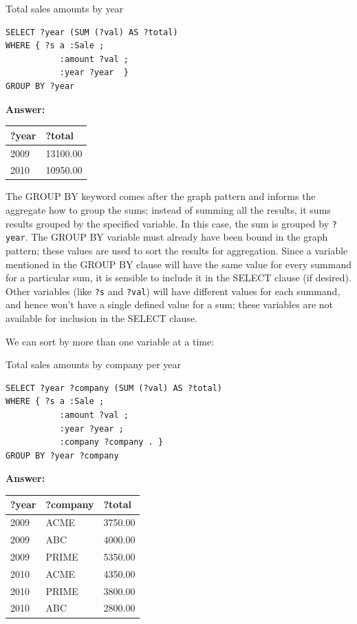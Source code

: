 \begin{query}Total sales amounts by year\end{query}

\begin{lstlisting}
SELECT ?year (SUM (?val) AS ?total)
WHERE { ?s a :Sale ;
           :amount ?val ;
           :year ?year  }
GROUP BY ?year
\end{lstlisting}

\textbf{\textbf{Answer:}}

\begin{tabular}{|ll|}
\hline
?year&?total\\
\hline
2009&13100.00\\
2010&10950.00\\
\hline
\end{tabular}

The GROUP BY keyword comes after the graph pattern and informs the
aggregate how to group the sums; instead of summing all the results, it
sums results grouped by the specified variable. In this case, the sum is
grouped by \texttt{?year}. The GROUP BY variable must already have been bound in
the graph pattern; these values are used to sort the results for
aggregation. Since a variable mentioned in the GROUP BY clause will have
the same value for every summand for a particular sum, it is sensible to
include it in the SELECT clause (if desired). Other variables (like \texttt{?s}
and \texttt{?val}) will have different values for each summand, and hence won't
have a single defined value for a sum; these variables are not available
for inclusion in the SELECT clause.

We can sort by more than one variable at a time:

\begin{query}Total sales amounts by company per year\end{query}

\begin{lstlisting}
SELECT ?year ?company (SUM (?val) AS ?total)
WHERE { ?s a :Sale ;
           :amount ?val ;
           :year ?year ;
           :company ?company . }
GROUP BY ?year ?company
\end{lstlisting}

\textbf{\textbf{Answer:}}

\begin{tabular}{|lll|}
\hline
?year&?company&?total\\
\hline
2009&ACME&3750.00\\
2009&ABC&4000.00\\
2009&PRIME&5350.00\\
2010&ACME&4350.00\\
2010&PRIME&3800.00\\
2010&ABC&2800.00\\
\hline
\end{tabular}

